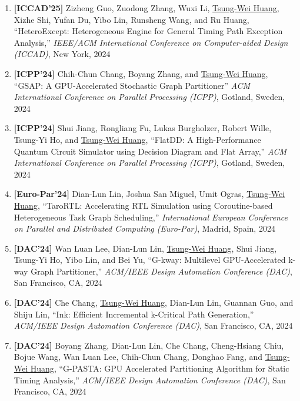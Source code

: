 \documentclass[A4,11pt]{article}
\begin{document}
\begin{enumerate}
    \item \textbf{[ICCAD'25]} Zizheng Guo, Zuodong Zhang, Wuxi Li, \underline{Tsung-Wei Huang}, Xizhe Shi, Yufan Du, Yibo Lin, Runsheng Wang, and Ru Huang, ``HeteroExcept: Heterogeneous Engine for General Timing Path Exception Analysis,'' \textit{IEEE/ACM International Conference on Computer-aided Design (ICCAD)}, New York, 2024 

    \item \textbf{[ICPP'24]} Chih-Chun Chang, Boyang Zhang, and \underline{Tsung-Wei Huang}, ``GSAP: A GPU-Accelerated Stochastic Graph Partitioner'' \textit{ACM International Conference on Parallel Processing (ICPP)}, Gotland, Sweden, 2024

    \item \textbf{[ICPP'24]} Shui Jiang, Rongliang Fu, Lukas Burgholzer, Robert Wille, Tsung-Yi Ho, and \underline{Tsung-Wei Huang}, ``FlatDD: A High-Performance Quantum Circuit Simulator using Decision Diagram and Flat Array,'' \textit{ACM International Conference on Parallel Processing (ICPP)}, Gotland, Sweden, 2024

    \item \textbf{[Euro-Par'24]} Dian-Lun Lin, Joshua San Miguel, Umit Ogras, \underline{Tsung-Wei Huang}, ``TaroRTL: Accelerating RTL Simulation using Coroutine-based Heterogeneous Task Graph Scheduling,'' \textit{International European Conference on Parallel and Distributed Computing (Euro-Par)}, Madrid, Spain, 2024

    \item \textbf{[DAC'24]} Wan Luan Lee, Dian-Lun Lin, \underline{Tsung-Wei Huang}, Shui Jiang, Tsung-Yi Ho, Yibo Lin, and Bei Yu, ``G-kway: Multilevel GPU-Accelerated k-way Graph Partitioner,'' \textit{ACM/IEEE Design Automation Conference (DAC)}, San Francisco, CA, 2024

    \item \textbf{[DAC'24]} Che Chang, \underline{Tsung-Wei Huang}, Dian-Lun Lin, Guannan Guo, and Shiju Lin, ``Ink: Efficient Incremental k-Critical Path Generation,'' \textit{ACM/IEEE Design Automation Conference (DAC)}, San Francisco, CA, 2024

    \item \textbf{[DAC'24]} Boyang Zhang, Dian-Lun Lin, Che Chang, Cheng-Hsiang Chiu, Bojue Wang, Wan Luan Lee, Chih-Chun Chang, Donghao Fang, and \underline{Tsung-Wei Huang}, ``G-PASTA: GPU Accelerated Partitioning Algorithm for Static Timing Analysis,'' \textit{ACM/IEEE Design Automation Conference (DAC)}, San Francisco, CA, 2024


\end{enumerate}
\end{document}
